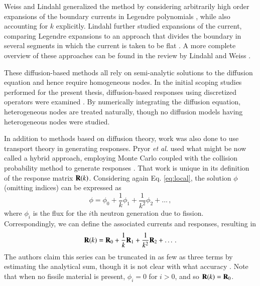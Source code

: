 Weiss and Lindahl generalized the method by considering
arbitrarily high order expansions of the boundary
currents in Legendre polynomials \cite{weiss1975hor}, while also accounting 
for $k$ explicitly.
Lindahl further studied expansions of the current,
comparing Legendre expansions to an approach that
divides the boundary in several segments in which
the current is taken to be flat \cite{lindahl1976mdr}.  A more
complete overview of these approaches can be found
in the review by Lindahl
and Weiss \cite{lindahl1981rrm}.

These diffusion-based methods all rely on semi-analytic solutions to the 
diffusion equation and hence require homogeneous nodes. In the initial 
scoping studies performed for the present thesis, diffusion-based 
responses using discretized operators were examined \cite{roberts2011ser}.  
By numerically integrating the diffusion equation, heterogeneous nodes 
are treated naturally, though no diffusion models having heterogeneous nodes 
were studied.

In addition to methods based on diffusion 
theory, work was also done to use transport theory
in generating responses.  Pryor {\it et al.} used
what might be now called a hybrid approach, employing
Monte Carlo coupled with the collision probability 
method to generate responses \cite{pryor1973rmm, pryor1975rdr,
sicilian1975atr}.  That work is unique in its definition
of the response matrix $\mathbf{R}(k)$.  Considering again
 Eq. \ref{eq:local}, the solution $\phi$ (omitting 
indices) can
be expressed as
\begin{equation}
 \phi = \phi_{0} + \frac{1}{k}\phi_{1}
                 + \frac{1}{k^2}\phi_{2}  + \ldots \, ,
\end{equation}
where $\phi_{i} $ is the flux for the $i$th neutron
generation due to fission.  Correspondingly, we
can define the associated currents and responses, 
resulting in 
\begin{equation}
 \mathbf{R}(k) = \mathbf{R}_0 + \frac{1}{k}\mathbf{R}_1
                 + \frac{1}{k^2}\mathbf{R}_2  + \ldots \, .
\label{eq:responsesum}
\end{equation}
The authors claim this series can be truncated in
as few as three terms by estimating the analytical
sum, though it is not clear with what accuracy
 \cite{sicilian1975atr}.  Note that when
 no fissile material
is present, $\phi_{i} = 0$ for $i > 0$, and so
$\mathbf{R}(k) = \mathbf{R}_0$.


